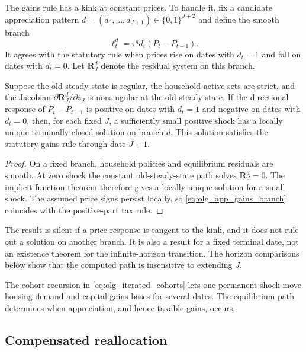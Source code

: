 The gains rule has a kink at constant prices.  To handle it, fix a candidate
appreciation pattern
$d=(d_0,\ldots,d_{J+1})\in\{0,1\}^{J+2}$ and define the smooth branch
\begin{equation}
 \ell_t^d=\tau^g d_t(P_t-P_{t-1}).
 \label{eq:olg_app_gains_branch}
\end{equation}
It agrees with the statutory rule when prices rise on dates with $d_t=1$ and
fall on dates with $d_t=0$.  Let $\mathbf R_J^d$ denote the residual system on
this branch.

\begin{proposition}
\label{prop:olg_app_local_transition}
Suppose the old steady state is regular, the household active sets are strict,
and the Jacobian $\partial\mathbf R_J^d/\partial z_J$ is nonsingular at the old
steady state.  If the directional response of $P_t-P_{t-1}$ is positive on
dates with $d_t=1$ and negative on dates with $d_t=0$, then, for each fixed
$J$, a sufficiently small positive shock has a locally unique terminally
closed solution on branch $d$.  This solution satisfies the statutory gains
rule through date $J+1$.
\end{proposition}

\begin{proof}
On a fixed branch, household policies and equilibrium residuals are smooth.
At zero shock the constant old-steady-state path solves
$\mathbf R_J^d=0$.  The implicit-function theorem therefore gives a locally
unique solution for a small shock.  The assumed price signs persist locally,
so \eqref{eq:olg_app_gains_branch} coincides with the positive-part tax rule.
\end{proof}

The result is silent if a price response is tangent to the kink, and it does
not rule out a solution on another branch.  It is also a result for a fixed
terminal date, not an existence theorem for the infinite-horizon transition.
The horizon comparisons below show that the computed path is insensitive to
extending $J$.

The cohort recursion in \eqref{eq:olg_iterated_cohorts} lets one permanent shock
move housing demand and capital-gains bases for several dates.  The equilibrium
path determines when appreciation, and hence taxable gains, occurs.

\subsection{Compensated reallocation}
\label{app:olg_reallocation}

